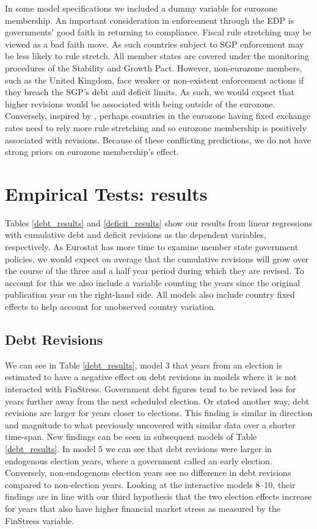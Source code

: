 \documentclass[]{article}
\begin{document}
In some model specifications we included a dummy variable for eurozone membership. An important consideration in enforcement through the EDP is governments' good faith in returning to compliance. Fiscal rule stretching may be viewed as a bad faith move. As such countries subject to SGP enforcement may be less likely to rule stretch. All member states are covered under the monitoring procedures of the Stability and Growth Pact. However, non-eurozone members, such as the United Kingdom, face weaker or non-existent enforcement actions if they breach the SGP's debt and deficit limits. As such, we would expect that higher revisions would be associated with being outside of the eurozone. Conversely, inspired by \cite{clark2003}, perhaps countries in the eurozone having fixed exchange rates need to rely more rule stretching and so eurozone membership is positively associated with revisions. Because of these conflicting predictions, we do not have strong priors on eurozone membership's effect.

\section{Empirical Tests: results}

Tables \ref{debt_results} and \ref{deficit_results} show our results from linear regressions with cumulative debt and deficit revisions as the dependent variables, respectively. As Eurostat has more time to examine member state government policies, we would expect on average that the cumulative revisions will grow over the course of the three and a half year period during which they are revised. To account for this we also include a variable counting the years since the original publication year on the right-hand side. All models also include country fixed effects to help account for unobserved country variation.

\subsection{Debt Revisions}

We can see in Table \ref{debt_results}, model 3 that years from an election is estimated to have a negative effect on debt revisions in models where it is not interacted with FinStress. Government debt figures tend to be revised less for years further away from the next scheduled election. Or stated another way, debt revisions are larger for years closer to elections. This finding is similar in direction and magnitude to what \cite{DeCastro2013} previously uncovered with similar data over a shorter time-span. New findings can be seen in subsequent models of Table \ref{debt_results}. In model 5 we can see that debt revisions were larger in endogenous election years, where a government called an early election. Conversely, non-endogenous election years see no difference in debt revisions compared to non-election years. Looking at the interactive models 8--10, their findings are in line with our third hypothesis that the two election effects increase for years that also have higher financial market stress as measured by the FinStress variable.
\end{document}
